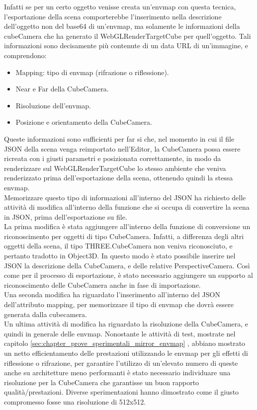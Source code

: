 Infatti se per un certo oggetto venisse creata un’envmap con questa tecnica, l’esportazione della scena comporterebbe l’inserimento nella descrizione dell’oggetto non del base64 di un’envmap, ma solamente le informazioni della cubeCamera che ha generato il WebGLRenderTargetCube per quell’oggetto. Tali informazioni sono decisamente più contenute di un data URL di un’immagine, e comprendono:
\begin{itemize}
\item Mapping: tipo di envmap (rifrazione o riflessione).
\item Near e Far della CubeCamera.
\item Risoluzione dell’envmap.
\item Posizione e orientamento della CubeCamera.
\end{itemize}
Queste informazioni sono sufficienti per far si che, nel momento in cui il file JSON della scena venga reimportato nell’Editor, la CubeCamera possa essere ricreata con i giusti parametri e posizionata correttamente, in modo da renderizzare sul WebGLRenderTargetCube lo stesso ambiente che veniva renderizzato prima dell’esportazione della scena, ottenendo quindi la stessa envmap.
\\
Memorizzare questo tipo di informazioni all’interno del JSON ha richiesto delle attività di modifica all’interno della funzione che si occupa di convertire la scena in JSON, prima dell’esportazione su file.
\\
La prima modifica è stata aggiungere all’interno della funzione di conversione un riconoscimento per oggetti di tipo CubeCamera. Infatti, a differenza degli altri oggetti della scena, il tipo THREE.CubeCamera non veniva riconosciuto, e pertanto tradotto in Object3D. In questo modo è stato possibile inserire nel JSON la descrizione della CubeCamera, e delle relative PerspectiveCamera. Così come per il processo di esportazione, è stato necessario aggiungere un supporto al riconoscimento delle CubeCamera anche in fase di importazione.
\\ 
Una seconda modifica ha riguardato l’inserimento all’interno del JSON dell’attributo mapping, per memorizzare il tipo di envmap che dovrà essere generata dalla cubecamera.
\\
Un ultima attività di modifica ha riguardato la risoluzione della CubeCamera, e quindi in generale delle envmap. Nonostante le attività di test, mostrate nel capitolo \ref{sec:chapter_prove_sperimentali_mirror_envmap} , abbiano mostrato un netto efficientamento delle prestazioni utilizzando le envmap per gli effetti di riflessione o rifrazione, per garantire l’utilizzo di un’elevato numero di queste anche su architetture meno performanti è stato necessario individuare una risoluzione per la CubeCamera che garantisse un buon rapporto qualità/prestazioni. Diverse sperimentazioni hanno dimostrato come il giusto compromesso fosse una risoluzione di 512x512.
